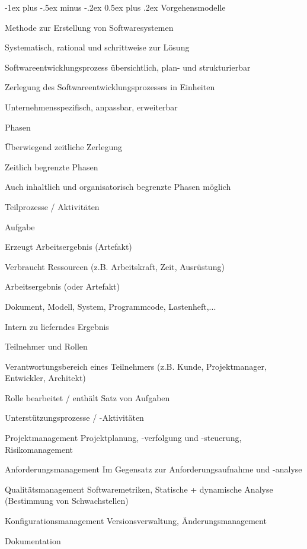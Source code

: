 \documentclass[a4paper]{article}
\makeatletter
\renewcommand{\section}{\@startsection{section}{1}{0mm}%
                                {-1ex plus -.5ex minus -.2ex}%
                                {0.5ex plus .2ex}%
                                {\normalfont\large\bfseries}}
\makeatother
\begin{document}
\begin{multicols}{3}
  \newpage
  \section{Vorgehensmodelle}
  \begin{itemize*}
    \item Methode zur Erstellung von Softwaresystemen
    \item Systematisch, rational und schrittweise zur Lösung
    \item Softwareentwicklungsprozess übersichtlich, plan- und strukturierbar
    \item Zerlegung des Softwareentwicklungsprozesses in Einheiten
    \item Unternehmensspezifisch, anpassbar, erweiterbar
  \end{itemize*}

  Phasen
  \begin{itemize*}
    \item Überwiegend zeitliche Zerlegung
    \item Zeitlich begrenzte Phasen
    \item Auch inhaltlich und organisatorisch begrenzte Phasen möglich
    \item Teilprozesse / Aktivitäten
  \end{itemize*}

  Aufgabe
  \begin{itemize*}
    \item Erzeugt Arbeitsergebnis (Artefakt)
    \item Verbraucht Ressourcen (z.B. Arbeitskraft, Zeit, Ausrüstung)
  \end{itemize*}

  Arbeitsergebnis (oder Artefakt)
  \begin{itemize*}
    \item Dokument, Modell, System, Programmcode, Lastenheft,...
    \item Intern zu lieferndes Ergebnis
  \end{itemize*}

  Teilnehmer und Rollen
  \begin{itemize*}
    \item Verantwortungsbereich eines Teilnehmers (z.B. Kunde, Projektmanager, Entwickler, Architekt)
    \item Rolle bearbeitet / enthält Satz von Aufgaben
  \end{itemize*}

  Unterstützungsprozesse / -Aktivitäten
  \begin{description*}
    \item[Projektmanagement] Projektplanung, -verfolgung und -steuerung, Risikomanagement
    \item[Anforderungsmanagement] Im Gegensatz zur Anforderungsaufnahme und -analyse
    \item[Qualitätsmanagement] Softwaremetriken, Statische + dynamische Analyse (Bestimmung von Schwachstellen)
    \item[Konfigurationsmanagement] Versionsverwaltung, Änderungsmanagement
    \item[Dokumentation]
  \end{description*}


\end{multicols}
\end{document}
